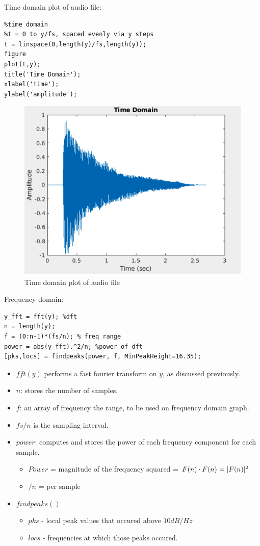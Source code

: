 \documentclass[12pt,a4paper]{article}
\begin{document}
		Time domain plot of audio file:
		\begin{lstlisting}
%time domain
%t = 0 to y/fs, spaced evenly via y steps
t = linspace(0,length(y)/fs,length(y));
figure
plot(t,y);
title('Time Domain');
xlabel('time');
ylabel('amplitude');
		\end{lstlisting}
		\begin{figure}[h]
			\begin{center}
			\includegraphics[width=0.7\linewidth]{time_domain_plot}
			\end{center}
			\caption{Time domain plot of audio file}
		\end{figure}
\newpage	
Frequency domain:
		\begin{lstlisting}
y_fft = fft(y); %dft
n = length(y);
f = (0:n-1)*(fs/n); % freq range
power = abs(y_fft).^2/n; %power of dft
[pks,locs] = findpeaks(power, f, MinPeakHeight=16.35);
		\end{lstlisting}
\begin{itemize}
	\item $fft(y)$ performs a fast fourier transform on $y$, as discussed previously.
	\item $n$: stores rhe number of samples.
	\item $f$: an array of frequency the range, to be used on frequency domain graph.
	\item $fs/n$ is the sampling interval.\cite{SamplingInterval}
	\item $power$: computes and stores the power of each frequency component for each sample.
			\begin{itemize}
					\item [] $Power$ = magnitude of the frequency squared = $F(n)\cdot F(n)^{\*} = |F(n)|^{2}$\cite{PowerSpectrum}
					\item [] $/n$ = per sample
			\end{itemize}
	\item $findpeaks()$
			\begin{itemize}
				\item[] $pks$ - local peak values that occured above $10dB/Hz$
				\item[] $locs$ - frequencies at which those peaks occured.
			\end{itemize}
\end{itemize}
\end{document}
